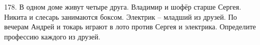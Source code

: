178. В одном доме живут четыре друга. Владимир и шофёр старше Сергея. Никита и слесарь занимаются боксом. Электрик – младший из друзей. По вечерам Андрей и токарь играют в лото против Сергея и электрика. Определите профессию каждого из друзей.\\
